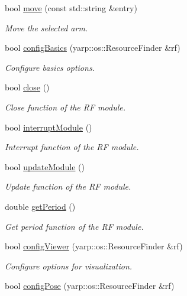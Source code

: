 \begin{DoxyCompactItemize}
bool \hyperlink{classGraspingModule_a08bd9cdbb1d16da8616c9769510e2bf1}{move} (const std\+::string \&entry)
\begin{DoxyCompactList}\small\item\em Move the selected arm. \end{DoxyCompactList}\item 
bool \hyperlink{classGraspingModule_a518ee4ec1b27d32c600f340c0f3bf552}{config\+Basics} (yarp\+::os\+::\+Resource\+Finder \&rf)
\begin{DoxyCompactList}\small\item\em Configure basics options. \end{DoxyCompactList}\item 
bool \hyperlink{classGraspingModule_a151b46117f2d1fdd8c321554012d63f3}{close} ()
\begin{DoxyCompactList}\small\item\em Close function of the RF module. \end{DoxyCompactList}\item 
bool \hyperlink{classGraspingModule_aca7dc9ec5e0a98b1333ed4c63650cdba}{interrupt\+Module} ()
\begin{DoxyCompactList}\small\item\em Interrupt function of the RF module. \end{DoxyCompactList}\item 
bool \hyperlink{classGraspingModule_af2cd7fa157b5d78080ffd7952655046d}{update\+Module} ()
\begin{DoxyCompactList}\small\item\em Update function of the RF module. \end{DoxyCompactList}\item 
double \hyperlink{classGraspingModule_abfc60b8437d750f2b2a48b8a617e53c1}{get\+Period} ()
\begin{DoxyCompactList}\small\item\em Get period function of the RF module. \end{DoxyCompactList}\item 
bool \hyperlink{classGraspingModule_a1086203a4db1e465ef8aba5e28f60025}{config\+Viewer} (yarp\+::os\+::\+Resource\+Finder \&rf)
\begin{DoxyCompactList}\small\item\em Configure options for visualization. \end{DoxyCompactList}\item 
bool \hyperlink{classGraspingModule_ab6d6d4c684340a0e4988a338ff72e3d0}{config\+Pose} (yarp\+::os\+::\+Resource\+Finder \&rf)

\end{DoxyCompactItemize}

